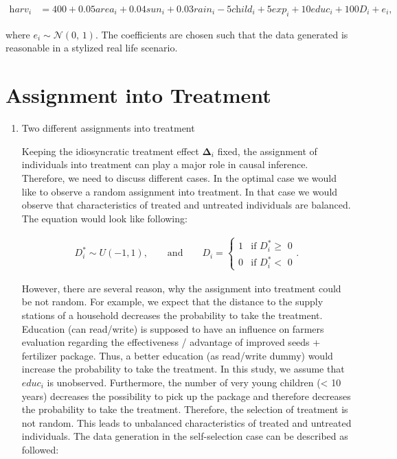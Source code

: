 \begin{align}
	\label{eq:eq4}
	\textit{harv}_i &= 400 + 0.05 \textit{area}_i + 0.04 \textit{sun}_i + 0.03 \textit{rain}_i - 5 \textit{child}_i + 5 \textit{exp}_i + 10 \textit{educ}_i + 100 \textit{D}_i + \textit{e}_i,
\end{align}

where $\textit{e}_i \sim \mathcal{N}(0,\,1)$. The coefficients are chosen such that the data generated is reasonable in a stylized real life scenario. 


\section{Assignment into Treatment} \label{sec:assignment}

\begin{enumerate}
\item Two different assignments into treatment

Keeping the idiosyncratic treatment effect $\boldsymbol{\Delta}_i$ fixed, the assignment of individuals into treatment can play a major role in causal inference. Therefore, we need to discuss different cases. In the optimal case we would like to observe a random assignment into treatment. In that case we would observe that characteristics of treated and untreated individuals are balanced. The equation would look like following:

\begin{align}
	\label{eq:eq5}
	\textit{D}_i^\ast \sim U(-1, 1), 
	\qquad \text{and}  \qquad
 	\textit{D}_i =
    	\begin{cases}
      1 & \text{if $\textit{D}_i^\ast \geq$ 0}\\
      0 & \text{if $\textit{D}_i^\ast <$ 0}
    	\end{cases}. 
\end{align}


However, there are several reason, why the assignment into treatment could be not random. For example, we expect that the distance to the supply stations of a household decreases the probability to take the treatment. Education (can read/write) is supposed to have an influence on farmers evaluation regarding the effectiveness / advantage of improved seeds + fertilizer package. Thus, a better education (as read/write dummy) would increase the probability to take the treatment. In this study, we assume that $\textit{educ}_i$ is unobserved. Furthermore, the number of very young children (< 10 years) decreases the possibility to pick up the package and therefore decreases the probability to take the treatment. Therefore, the selection of treatment is not random. This leads to unbalanced characteristics of treated and untreated individuals. The data generation in the self-selection case can be described as followed:


\end{enumerate}
